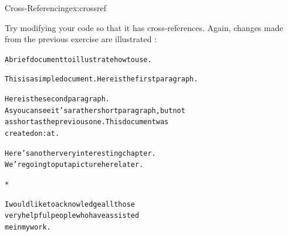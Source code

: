\begin{exercise}{Cross-Referencing}{ex:crossref}

Try modifying your code so that it has cross-references.
Again, changes made from the previous exercise are
illustrated :
\begin{bcode}
\begin{alltt}
\oarg{12pt}






A brief document to illustrate how to use .



This is a simple document.  Here is the first paragraph.


Here is the second paragraph. 
As you can see it's a rather short paragraph, but not 
as short as the previous one. This document was 
created on: at .


Here's another very interesting chapter.
We're going to put a picture here later.

*

I would like to acknowledge all those
very helpful people who have assisted
me in my work.



\end{alltt}
\end{bcode}
\end{exercise}
